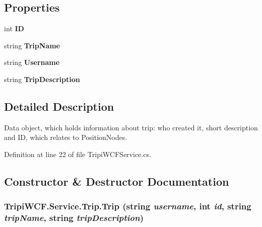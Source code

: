 \subsection*{Properties}
\begin{DoxyCompactItemize}
\item 
\hypertarget{class_tripi_w_c_f_1_1_service_1_1_trip_abe6972fc612a3749b72c1c12661cc8ad}{
int {\bfseries ID}}
\label{class_tripi_w_c_f_1_1_service_1_1_trip_abe6972fc612a3749b72c1c12661cc8ad}

\item 
\hypertarget{class_tripi_w_c_f_1_1_service_1_1_trip_ab3178ccd1a3906add6132cd72668c11e}{
string {\bfseries TripName}}
\label{class_tripi_w_c_f_1_1_service_1_1_trip_ab3178ccd1a3906add6132cd72668c11e}

\item 
\hypertarget{class_tripi_w_c_f_1_1_service_1_1_trip_adb6f9c38b858cf4101e9325f08bbd4ec}{
string {\bfseries Username}}
\label{class_tripi_w_c_f_1_1_service_1_1_trip_adb6f9c38b858cf4101e9325f08bbd4ec}

\item 
\hypertarget{class_tripi_w_c_f_1_1_service_1_1_trip_aa475109330f8c1f06f1b923fdeb792d8}{
string {\bfseries TripDescription}}
\label{class_tripi_w_c_f_1_1_service_1_1_trip_aa475109330f8c1f06f1b923fdeb792d8}

\end{DoxyCompactItemize}


\subsection{Detailed Description}
Data object, which holds information about trip: who created it, short description and ID, which relates to PositionNodes. 

Definition at line 22 of file TripiWCFService.cs.

\subsection{Constructor \& Destructor Documentation}
\hypertarget{class_tripi_w_c_f_1_1_service_1_1_trip_a2fe85e5fde97ea9a387bad11ca5dd324}{
\subsubsection[{Trip}]{\setlength{\rightskip}{0pt plus 5cm}TripiWCF.Service.Trip.Trip (string {\em username}, \/  int {\em id}, \/  string {\em tripName}, \/  string {\em tripDescription})}}
\label{class_tripi_w_c_f_1_1_service_1_1_trip_a2fe85e5fde97ea9a387bad11ca5dd324}


